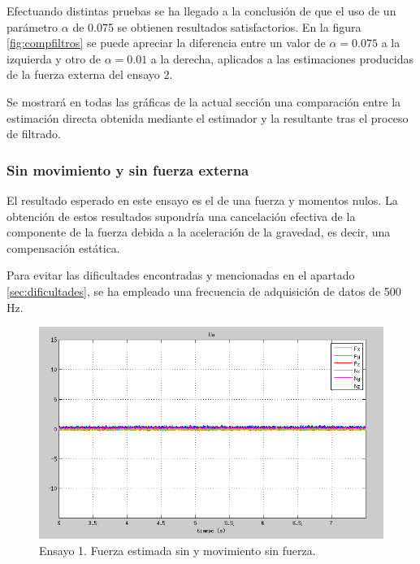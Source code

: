 Efectuando distintas pruebas se ha llegado a la conclusión de que el uso de un parámetro $\alpha$ de 0.075 se obtienen resultados satisfactorios. En la figura \ref{fig:compfiltros} se puede apreciar la diferencia entre un valor de $\alpha = 0.075$ a la izquierda y otro de $\alpha = 0.01$ a la derecha, aplicados a las estimaciones producidas de la fuerza externa del ensayo 2. \par 

Se mostrará en todas las gráficas de la actual sección una comparación entre la estimación directa obtenida mediante el estimador y la resultante tras el proceso de filtrado. \par 

\subsubsection{Sin movimiento y sin fuerza externa}

El resultado esperado en este ensayo es el de una fuerza y momentos nulos. La obtención de estos resultados supondría una cancelación efectiva de la componente de la fuerza debida a la aceleración de la gravedad, es decir, una compensación estática. \par 

Para evitar las dificultades encontradas y mencionadas en el apartado \ref{sec:dificultades}, se ha empleado una frecuencia de adquisición de datos de 500 Hz. \par 

\begin{figure}[h!]
\centering
\includegraphics[scale=0.55]{Figuras/smsf-Ue}
\caption[Ensayo 1. Fuerza estimada sin movimiento y sin fuerza]{Ensayo 1. Fuerza estimada sin y movimiento sin fuerza.}
\label{fig:smsf-Ue}
\end{figure}


